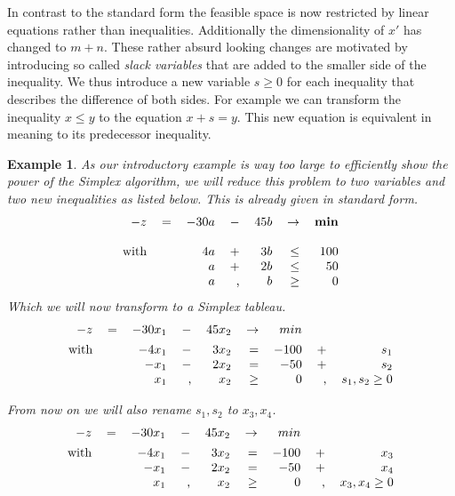 \documentclass[a4paper, 11pt]{article}
\newtheorem{example}{Example}
\begin{document}
In contrast to the standard form the feasible space is now restricted by linear equations rather than inequalities. Additionally the dimensionality of $x'$ has changed to $m+n$. These rather absurd looking changes are motivated by introducing so called \textit{slack variables} that are added to the smaller side of the inequality. We thus introduce a new variable $s\geq 0$ for each inequality that describes the difference of both sides. For example we can transform the inequality $x\leq y$ to the equation $x + s=y$. This new equation is equivalent in meaning to its predecessor inequality.\\

\begin{example}
	As our introductory example is way too large to efficiently show the power of the Simplex algorithm, we will reduce this problem to two variables and two new inequalities as listed below. This is already given in standard form.\\
	
	\begin{equation}
		\begin{tabular}{rrrrrrr}
			$ -z $&$=$& $-30a$ &$- $&$45b$ &$\rightarrow$& $\textbf{min}$ \\
			\\
			with&&$4a$ &$+$&$3b$&$\leq$&$100$\\
			&&$a$ & $+$&$2b$&$\leq$&$50$\\
			&&$a$ & ,&$b$ &$\geq$&$0$
		\end{tabular}
	\end{equation}
	Which we will now transform to a Simplex tableau.
	\begin{equation}
		\begin{tabular}{rrrrrrrrr}
			$ -z $&$=$& $-30x_1$ &$-$&$45x_2$ &$\rightarrow$& \textbf{$min$}&& \vspace{0.15cm}\\
			with &&$-4x_1$ &$-$&$3x_2$&$=$&$-100$&$+$&$s_1$\\
			&&$-x_1$ & $-$&$2x_2$&$=$&$-50$&$+$&$s_2$\\
			&&$x_1$ &, &$x_2$&$\geq$&$0$ &,&$s_1, s_2 \geq 0$
		\end{tabular}
	\end{equation}

	From now on we will also rename $s_1,s_2$ to $x_3, x_4$.
	\begin{equation}
		\begin{tabular}{rrrrrrrrr}
			$ -z $&$=$& $-30x_1$ &$-$&$45x_2$ &$\rightarrow$& \textbf{$min$}&& \vspace{0.15cm}\\
			with &&$-4x_1$ &$-$&$3x_2$&$=$&$-100$&$+$&$x_3$\\
			&&$-x_1$ & $-$&$2x_2$&$=$&$-50$&$+$&$x_4$\\
			&&$x_1$ &, &$x_2$&$\geq$&$0$ &,&$x_3, x_4 \geq 0$
		\end{tabular}
	\end{equation}
\end{example}
\end{document}
